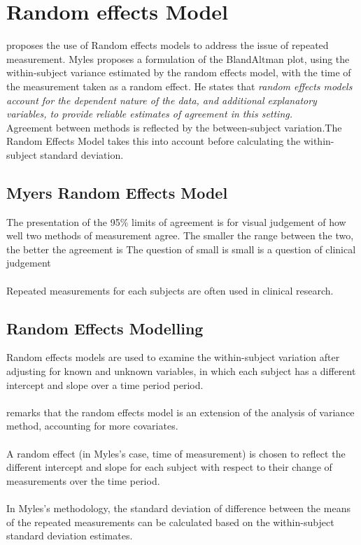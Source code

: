 \documentclass[12pt, a4paper]{report}
\theoremstyle{plain}
\theoremstyle{definition}
\theoremstyle{remark}
\begin{document}
\section{Random effects Model} \citet{Myles} proposes the use of
Random effects models to address the issue of repeated
measurement. Myles proposes a formulation of the BlandAltman
plot, using the within-subject variance estimated by the random
effects model, with the time of the measurement taken as a random
effect. He states that \emph{random effects models account for the
	dependent nature of the data, and additional explanatory
	variables, to provide reliable estimates of agreement in this
	setting.}
\\
Agreement between methods is reflected by the between-subject
variation.The Random Effects Model takes this into account before
calculating the within-subject standard deviation.
\subsection{Myers Random Effects Model} The presentation of the
95\% limits of agreement is for visual judgement of how well two
methods of measurement agree. The smaller the range between the
two, the better the agreement is The question of small is small is
a question of clinical judgement
\\
\\
Repeated measurements for each subjects are often used in clinical
research.

\subsection{Random Effects Modelling}
Random effects models are used to examine the within-subject
variation after adjusting for known and unknown variables, in
which each subject has a different intercept and slope over a time
period period.
\\
\\
\citet{Myles} remarks that the random effects model is an
extension of the analysis of variance method, accounting for more
covariates.
\\
\\
A random effect (in Myles's case, time of measurement) is chosen
to reflect the different intercept and slope for each subject with
respect to their change of measurements over the time period.
\\
\\
In Myles's methodology, the standard deviation of difference
between the means of the repeated measurements can be calculated
based on the within-subject standard deviation estimates.
\end{document}
